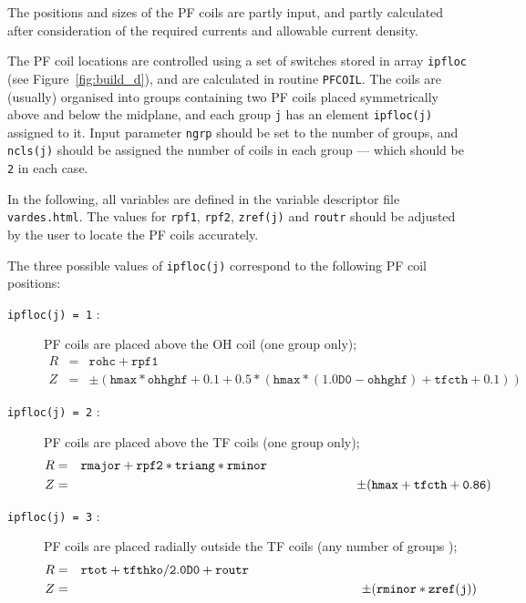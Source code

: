 \documentclass[11pt,a4paper]{report}
\begin{document}
The positions and sizes of the PF coils are partly input, and partly
calculated after consideration of the required currents and allowable current
density.

The PF coil locations are controlled using a set of switches stored in array
\texttt{ipfloc} (see Figure~\ref{fig:build_d}), and are calculated in routine
\texttt{PFCOIL}. The coils are (usually) organised into groups containing two
PF coils placed symmetrically above and below the midplane, and each group
\texttt{j} has an element \texttt{ipfloc(j)} assigned to it. Input parameter
\texttt{ngrp} should be set to the number of groups, and \texttt{ncls(j)}
should be assigned the number of coils in each group --- which should be
\texttt{2} in each case.

In the following, all variables are defined in the variable descriptor file
\texttt{vardes.html}. The values for \texttt{rpf1}, \texttt{rpf2},
\texttt{zref(j)} and \texttt{routr} should be adjusted by the user to locate
the PF coils accurately.

The three possible values of \texttt{ipfloc(j)} correspond to the following PF
coil positions:

\begin{description} %

\item [\texttt{ipfloc(j) = 1} :]  PF coils are placed above the OH coil (one
group only);
\begin{eqnarray*}
R & = & \mathtt{rohc + rpf1} \\
Z & = & \pm
\mathtt{( hmax*ohhghf + 0.1 + 0.5*( hmax*(1.0D0-ohhghf)+tfcth+0.1) )}
\end{eqnarray*}

\item [\texttt{ipfloc(j) = 2} :]  PF coils are placed above the TF coils (one
group only);
\begin{eqnarray*}
R & = & \mathtt{rmajor + rpf2*triang*rminor} \hspace{62mm} \\
Z & = & \pm (\mathtt{hmax + tfcth + 0.86})
\end{eqnarray*}

\item [\texttt{ipfloc(j) = 3} :]  PF coils are placed radially outside the TF
coils (any number of groups );
\begin{eqnarray*}
R & = & \mathtt{rtot + tfthko/2.0D0 + routr} \hspace{63mm}\\
Z & = & \pm(\mathtt{rminor*zref(j)})
\end{eqnarray*}

\end{description}
\end{document}

